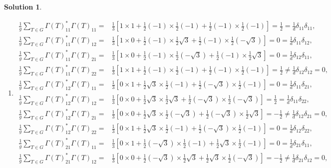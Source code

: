 \documentclass[UTF8,10pt,a4paper]{article}
\theoremstyle{Problem}
\theoremstyle{Solution}
\newtheorem*{sol}{Solution}
\begin{document}
\begin{sol}
    \begin{enumerate}
        \item[(a)] 
        \begin{align}
            \frac{1}{g}\sum_{T\in G}\Gamma(T)_{11}^*\Gamma(T)_{11}=&\frac{1}{3}[1\times 1+\frac{1}{2}(-1)\times\frac{1}{2}(-1)+\frac{1}{2}(-1)\times\frac{1}{2}(-1)]=\frac{1}{2}=\frac{1}{d}\delta_{11}\delta_{11},\\
            \frac{1}{g}\sum_{T\in G}\Gamma(T)_{11}^*\Gamma(T)_{12}=&\frac{1}{3}[1\times 0+\frac{1}{2}(-1)\times\frac{1}{2}\sqrt{3}+\frac{1}{2}(-1)\times\frac{1}{2}(-\sqrt{3})]=0=\frac{1}{d}\delta_{11}\delta_{12},\\
            \frac{1}{g}\sum_{T\in G}\Gamma(T)_{11}^*\Gamma(T)_{21}=&\frac{1}{3}[1\times 0+\frac{1}{2}(-1)\times\frac{1}{2}(-\sqrt{3})+\frac{1}{2}(-1)\times\frac{1}{2}\sqrt{3}]=0=\frac{1}{d}\delta_{12}\delta_{11},\\
            \frac{1}{g}\sum_{T\in G}\Gamma(T)_{11}^*\Gamma(T)_{22}=&\frac{1}{3}[1\times 1+\frac{1}{2}(-1)\times\frac{1}{2}(-1)+\frac{1}{2}(-1)\times\frac{1}{2}(-1)]=\frac{1}{2}\neq\frac{1}{d}\delta_{12}\delta_{12}=0,\\
            \frac{1}{g}\sum_{T\in G}\Gamma(T)_{12}^*\Gamma(T)_{11}=&\frac{1}{3}[0\times 1+\frac{1}{2}\sqrt{3}\times\frac{1}{2}(-1)+\frac{1}{2}(-\sqrt{3})\times\frac{1}{2}(-1)]=0=\frac{1}{d}\delta_{11}\delta_{21},\\
            \frac{1}{g}\sum_{T\in G}\Gamma(T)_{12}^*\Gamma(T)_{12}=&\frac{1}{3}[0\times 0+\frac{1}{2}\sqrt{3}\times\frac{1}{2}\sqrt{3}+\frac{1}{2}(-\sqrt{3})\times\frac{1}{2}(-\sqrt{3})]=\frac{1}{2}=\frac{1}{d}\delta_{11}\delta_{22},\\
            \frac{1}{g}\sum_{T\in G}\Gamma(T)_{12}^*\Gamma(T)_{21}=&\frac{1}{3}[0\times 0+\frac{1}{2}\sqrt{3}\times\frac{1}{2}(-\sqrt{3})+\frac{1}{2}(-\sqrt{3})\times\frac{1}{2}\sqrt{3}]=-\frac{1}{2}\neq\frac{1}{d}\delta_{12}\delta_{21}=0,\\
            \frac{1}{g}\sum_{T\in G}\Gamma(T)_{12}^*\Gamma(T)_{22}=&\frac{1}{3}[0\times 1+\frac{1}{2}\sqrt{3}\times\frac{1}{2}(-1)+\frac{1}{2}(-\sqrt{3})\times\frac{1}{2}(-1)]=0=\frac{1}{d}\delta_{12}\delta_{22},\\
            \frac{1}{g}\sum_{T\in G}\Gamma(T)_{21}^*\Gamma(T)_{11}=&\frac{1}{3}[0\times 1+\frac{1}{2}(-\sqrt{3})\times\frac{1}{2}(-1)+\frac{1}{2}\sqrt{3}\times\frac{1}{2}(-1)]=0=\frac{1}{d}\delta_{21}\delta_{11},\\
            \frac{1}{g}\sum_{T\in G}\Gamma(T)_{21}^*\Gamma(T)_{12}=&\frac{1}{3}[0\times 0+\frac{1}{2}(-\sqrt{3})\times\frac{1}{2}\sqrt{3}+\frac{1}{2}\sqrt{3}\times\frac{1}{2}(-\sqrt{3})]=-\frac{1}{2}\neq\frac{1}{d}\delta_{21}\delta_{12}=0,\\

\end{align}
\end{enumerate}
\end{sol}
\end{document}
